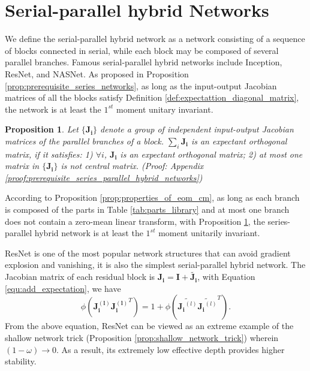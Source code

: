 \documentclass[10pt,journal,compsoc]{IEEEtran}
\newtheorem{prop}{Proposition}[section]
\begin{document}
 
\section{Serial-parallel hybrid Networks}
We define the serial-parallel hybrid network as a network consisting of a sequence of blocks connected in serial, while each block may be composed of several parallel branches. Famous serial-parallel hybrid networks include Inception\cite{szegedy2015going}, ResNet\cite{he2016deep}, and NASNet\cite{zoph2018learning}. As proposed in Proposition \ref{prop:prerequisite_series_networks}, as long as the input-output Jacobian matrices of all the blocks satisfy Definition \ref{def:expectattion_diagonal_matrix}, the network is at least the $1^{st}$ moment unitary invariant.

\begin{prop}
Let $\{\mathbf{J_i}\}$ denote a group of independent input-output Jacobian matrices of the parallel branches of a block. $\sum_i\mathbf{J_i}$ is an expectant orthogonal matrix, if it satisfies: 1) $\forall i$, $\mathbf{J_i}$ is an expectant orthogonal matrix; 2) at most one matrix in $\{\mathbf{J_i}\}$ is not central matrix. (Proof: Appendix \ref{proof:prerequisite_series_parallel_hybrid_networks})
\label{prop:prerequisite_series_parallel_hybrid_networks}
\end{prop}

According to Proposition \ref{prop:properties_of_eom_cm}, as long as each branch is composed of the parts in Table \ref{tab:parts_library} and at most one branch does not contain a zero-mean linear transform, with Proposition \ref{prop:prerequisite_series_parallel_hybrid_networks}, the series-parallel hybrid network is at least the $1^{st}$ moment unitarily invariant.

ResNet \cite{he2016deep} is one of the most popular network structures that can avoid gradient explosion and vanishing, it is also the simplest serial-parallel hybrid network. The Jacobian matrix of each residual block is $\mathbf{J_i} = \mathbf{I} + \widetilde{\mathbf{J_i}}$, with Equation \eqref{equ:add_expectation}, we have
\begin{equation}
    \phi\left(\mathbf{J_i^{(l)}J_i^{(l)}}^T\right) = 1 + \phi\left(\widetilde{\mathbf{J_i}^{(l)}}\widetilde{\mathbf{J_i}^{(l)}}^T\right).
\label{equ:shortcut}
\end{equation}
From the above equation, ResNet can be viewed as an extreme example of the shallow network trick (Proposition \ref{prop:shallow_network_trick}) wherein $(1-\omega)\rightarrow 0$. As a result, its extremely low effective depth provides higher stability. 
\end{document}
